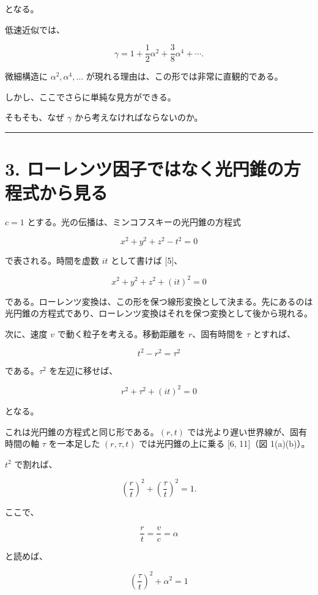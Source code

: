 \documentclass[
  a4paper,
]{ltjsarticle}
\begin{document}
となる。

低速近似では、

\[
\gamma
=
1+\frac12\alpha^2
+\frac38\alpha^4+\cdots .
\]

微細構造に \(\alpha^2,\alpha^4,\ldots\)
が現れる理由は、この形では非常に直観的である。

しかし、ここでさらに単純な見方ができる。

そもそも、なぜ \(\gamma\) から考えなければならないのか。

\begin{center}\rule{0.5\linewidth}{0.5pt}\end{center}

\section{3.
ローレンツ因子ではなく光円錐の方程式から見る}\label{ux30edux30fcux30ecux30f3ux30c4ux56e0ux5b50ux3067ux306fux306aux304fux5149ux5186ux9310ux306eux65b9ux7a0bux5f0fux304bux3089ux898bux308b}

\(c=1\) とする。光の伝播は、ミンコフスキーの光円錐の方程式

\[
x^2+y^2+z^2-t^2=0
\]

で表される。時間を虚数 \(it\) として書けば {[}5{]}、

\[
\boxed{x^2+y^2+z^2+(it)^2=0}
\]

である。ローレンツ変換は、この形を保つ線形変換として決まる。先にあるのは光円錐の方程式であり、ローレンツ変換はそれを保つ変換として後から現れる。

次に、速度 \(v\) で動く粒子を考える。移動距離を \(r\)、固有時間を
\(\tau\) とすれば、

\[
t^2-r^2=\tau^2
\]

である。\(\tau^2\) を左辺に移せば、

\[
\boxed{r^2+\tau^2+(it)^2=0}
\]

となる。

これは光円錐の方程式と同じ形である。\((r,t)\)
では光より遅い世界線が、固有時間の軸 \(\tau\) を一本足した
\((r,\tau,t)\) では光円錐の上に乗る {[}6, 11{]}（図 1(a)(b)）。

\(t^2\) で割れば、

\[
\left(\frac rt\right)^2+
\left(\frac \tau t\right)^2=1.
\]

ここで、

\[
\frac rt=\frac vc=\alpha
\]

と読めば、

\[
\boxed{
\left(\frac \tau t\right)^2+\alpha^2=1
}
\]
\end{document}

